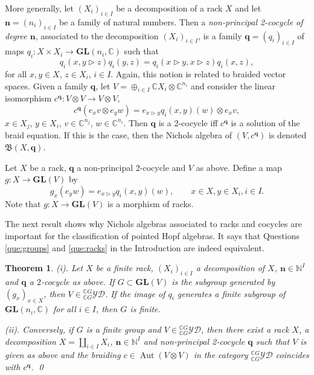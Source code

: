 \documentclass[11pt]{amsart} \textheight 22cm
\renewcommand{\^}[1]{\mbox{$^{\left( #1 \right)}$}}
\renewcommand{\_}[1]{\mbox{$_{\left( #1 \right)}$}}
\newcommand\toba{{\mathfrak B }}
\newcommand{\trid}{\triangleright}
\newcommand{\ku}{\mathbb C}
\newcommand{\N}{{\mathbb N}}
\newcommand{\q}{{\mathbf q}}
\newcommand{\GL}{\mathbf{GL}}
\newcommand{\n}{\mathbf{n}}
\newcommand{\ydg}{{}^{\ku G}_{\ku G}\mathcal{YD}}
\newcommand{\Aut}{\operatorname{Aut}}
\theoremstyle{plain}
\newtheorem{theorem}[lema]{Theorem}
\theoremstyle{definition}
\theoremstyle{remark}
\theoremstyle{remark}
\begin{document}
\medbreak More generally, let $(X_i)_{i\in I}$ be a decomposition
of a rack $X$ and let $\n = (n_i)_{i\in I}$ be a family of natural
numbers. Then a \emph{non-principal 2-cocycle of degree $\n$},
associated to the decomposition $(X_i)_{i\in I}$, is a family $\q
= (q_i)_{i\in I}$ of maps $q_i: X \times X_i \to \GL(n_i,\ku)$
such that
\begin{equation}\label{eqn:non-ppal-cocycle}
    q_i(x,y\trid z)q_i(y,z)= q_i(x\trid y,x\trid z)q_i(x,z),
\end{equation}
for all $x,y\in X$, $z\in X_i$, $i\in I$. Again, this notion is
related to braided vector spaces. Given a family $\q$, let $V=
\oplus_{i\in I} \ku X_i\otimes\ku^{n_i}$ and consider the linear
isomorphism $c^{\q}:V\otimes V\to V\otimes V$,
$$  c^{\q}(e_xv\otimes e_yw)= e_{x\trid y}q_i(x,y)(w)\otimes e_xv,$$
$x\in X_j$, $y\in X_i$, $v\in\ku^{n_j}$, $w\in\ku^{n_i}$. Then
$\q$ is a 2-cocycle iff $c^{\q}$ is a solution of the braid
equation. If this is the case, then the Nichols algebra of $(V,
c^{\q})$ is denoted $\toba(X, \q)$.

Let $X$ be a rack, $\q$ a non-principal 2-cocycle and $V$ as
above. Define a map $g: X \to \GL(V)$ by
\begin{equation}\label{eqn:defgpo}
   g_x(e_yw)= e_{x\trid y}q_i(x,y)(w), \qquad x\in X ,y\in X_i, i\in I.
\end{equation}
Note that $g: X \to \GL(V)$ is a morphism of racks.

\medbreak The next result shows why Nichols algebras associated to
racks and cocycles are important for the classification of pointed
Hopf algebras. It says that Questions \ref{que:groups} and
\ref{que:racks} in the Introduction are indeed equivalent.


\begin{theorem}\label{th:ag414} \cite[Th. 4.14]{AG1}
    (i).  Let $X$ be a finite rack, $(X_i)_{i\in I}$ a decomposition of $X$, $\n \in \N^I$
    and $\q$ a $2$-cocycle as above.  If $G\subset\GL(V)$ is the subgroup generated by
    $(g_x)_{x\in X}$, then $V \in \ydg$.  If the image of $q_i$ generates a finite subgroup
    of $\GL(n_i,\ku)$ for all $i\in I$, then $G$ is finite.

    \medbreak
    (ii). Conversely, if $G$ is a finite group and $V \in\ydg$, then there
    exist a rack $X$, a decomposition $X = \coprod_{i\in I} X_i$, $\n \in \N^I$  and
    non-principal 2-cocycle $\q$ such that $V$ is given as above and the braiding
    $c\in\Aut(V\otimes V)$ in the category $\ydg$ coincides with $c^{\q}$. \qed
\end{theorem}
\end{document}

